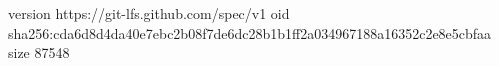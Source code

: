 version https://git-lfs.github.com/spec/v1
oid sha256:cda6d8d4da40e7ebc2b08f7de6dc28b1b1ff2a034967188a16352c2e8e5cbfaa
size 87548
